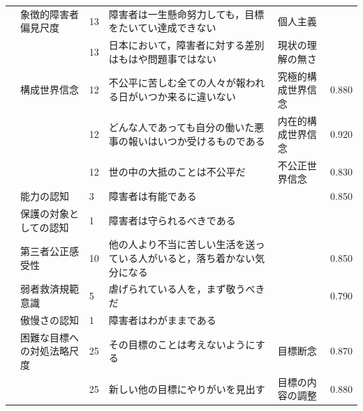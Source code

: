 \begin{landscape}
\begin{longtable}{p{2cm}p{2cm}p{2cm}p{6cm}p{2cm}p{2cm}}
		\textcite{Shimizu202292}    & 象徴的障害者偏見尺度                       & 13  & 障害者は一生懸命努力しても，目標をたいてい達成できない                         & 個人主義                 &            \\
		                         &                                  & 13  & 日本において，障害者に対する差別はもはや問題事ではない                         & 現状の理解の無さ             &            \\
		                         & 構成世界信念                           & 12  & 不公平に苦しむ全ての人々が報われる日がいつか来るに違いない                       & 究極的構成世界信念            & 0.880      \\
		                         &                                  & 12  & どんな人であっても自分の働いた悪事の報いはいつか受けるものである                    & 内在的構成世界信念            & 0.920      \\
		                         &                                  & 12  & 世の中の大抵のことは不公平だ                                      & 不公正世界信念              & 0.830      \\
		                         & 能力の認知                            & 3   & 障害者は有能である                                           &                      & 0.850      \\
		                         & 保護の対象としての認知                      & 1   & 障害者は守られるべきである                                       &                      &            \\
		                         & 第三者公正感受性                         & 10  & 他の人より不当に苦しい生活を送っている人がいると，落ち着かない気分になる                &                      & 0.850      \\
		                         & 弱者救済規範意識                         & 5   & 虐げられている人を，まず敬うべきだ                                   &                      & 0.790      \\
		                         & 傲慢さの認知                           & 1   & 障害者はわがままである                                         &                      &            \\
		\textcite{Toyama202292}     & 困難な目標への対処法略尺度                    & 25  & その目標のことは考えないようにする                                   & 目標断念                 & 0.870      \\
		                         &                                  & 25  & 新しい他の目標にやりがいを見出す                                    & 目標の内容の調整             & 0.880      \\

\end{longtable}
\end{landscape}
